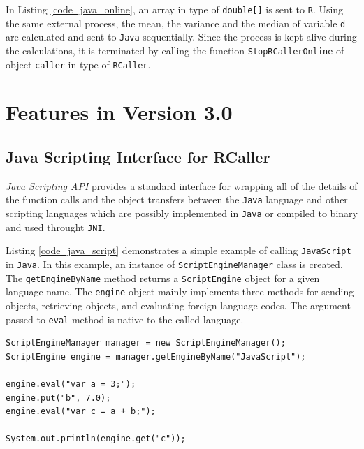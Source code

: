 \documentclass[10pt,a4paper, final, oneside]{article}
\begin{document}
In Listing \ref{code_java_online}, an array in type of \texttt{double[]} is sent to \texttt{R}. Using the same external process, the mean, the variance and the median of variable \texttt{d} are calculated and sent to \texttt{Java} sequentially. Since the process is kept alive during the calculations, it is terminated by calling the function \texttt{StopRCallerOnline} of object \texttt{caller} in type of \texttt{RCaller}.

\section{Features in Version 3.0}
\label{sec:features_in_version_3}

\subsection{Java Scripting Interface for RCaller}
\label{sec:javax_script_interface}
\emph{Java Scripting API} provides a standard interface for wrapping all of the details of the function calls and the object transfers between the \texttt{Java} language and other scripting languages which are possibly implemented in \texttt{Java} or compiled to binary and used throught \texttt{JNI}. 

Listing \ref{code_java_script} demonstrates a simple example of calling \texttt{JavaScript} in \texttt{Java}. In this example, an instance of \texttt{ScriptEngineManager} class is created. The \texttt{getEngineByName} method returns a \texttt{ScriptEngine} object for a given language name. The \texttt{engine} object mainly implements three methods for sending objects, retrieving objects, and evaluating foreign language codes. The argument passed to \texttt{eval} method is native to the called language. 


\begin{minipage}{\linewidth}
\begin{lstlisting}[caption=Calling JavaScript,label=code_java_script]
ScriptEngineManager manager = new ScriptEngineManager();
ScriptEngine engine = manager.getEngineByName("JavaScript");
        
engine.eval("var a = 3;");
engine.put("b", 7.0);
engine.eval("var c = a + b;");
        
System.out.println(engine.get("c"));
\end{lstlisting}
\end{minipage}
\end{document}
